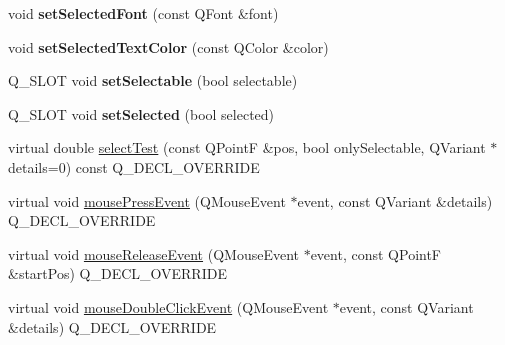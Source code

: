 \begin{DoxyCompactItemize}
void {\bfseries set\+Selected\+Font} (const Q\+Font \&font)
\item 
\mbox{\label{class_q_c_p_text_element_abaec200cae70a0eade53583defc0476d}} 
void {\bfseries set\+Selected\+Text\+Color} (const Q\+Color \&color)
\item 
\mbox{\label{class_q_c_p_text_element_a1a732a20a52faea6de88fd6beca96ec3}} 
Q\+\_\+\+S\+L\+OT void {\bfseries set\+Selectable} (bool selectable)
\item 
\mbox{\label{class_q_c_p_text_element_a9fb83ff13660adfa0d491af1b079d626}} 
Q\+\_\+\+S\+L\+OT void {\bfseries set\+Selected} (bool selected)
\item 
virtual double \hyperlink{class_q_c_p_text_element_a29d2998b50ef369d88ca990b9d3542b3}{select\+Test} (const Q\+PointF \&pos, bool only\+Selectable, Q\+Variant $\ast$details=0) const Q\+\_\+\+D\+E\+C\+L\+\_\+\+O\+V\+E\+R\+R\+I\+DE
\item 
virtual void \hyperlink{class_q_c_p_text_element_aa52d0292e7444526cccd453945238f4b}{mouse\+Press\+Event} (Q\+Mouse\+Event $\ast$event, const Q\+Variant \&details) Q\+\_\+\+D\+E\+C\+L\+\_\+\+O\+V\+E\+R\+R\+I\+DE
\item 
virtual void \hyperlink{class_q_c_p_text_element_a97d566f46653bb0b00a2c1556e6c1f7e}{mouse\+Release\+Event} (Q\+Mouse\+Event $\ast$event, const Q\+PointF \&start\+Pos) Q\+\_\+\+D\+E\+C\+L\+\_\+\+O\+V\+E\+R\+R\+I\+DE
\item 
virtual void \hyperlink{class_q_c_p_text_element_a45dcc9c527018f879c28b0d61b57147f}{mouse\+Double\+Click\+Event} (Q\+Mouse\+Event $\ast$event, const Q\+Variant \&details) Q\+\_\+\+D\+E\+C\+L\+\_\+\+O\+V\+E\+R\+R\+I\+DE
\end{DoxyCompactItemize}

